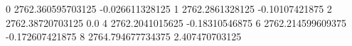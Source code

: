 0 2762.360595703125 -0.026611328125
1 2762.2861328125 -0.10107421875
2 2762.38720703125 0.0
4 2762.2041015625 -0.18310546875
6 2762.214599609375 -0.172607421875
8 2764.794677734375 2.407470703125
